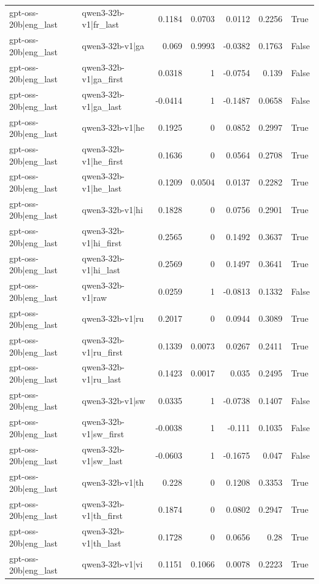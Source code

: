\begin{table}
\begin{tabular}{l l r r r r l}
gpt-oss-20b|eng_last & qwen3-32b-v1|fr_last & 0.1184 & 0.0703 & 0.0112 & 0.2256 & True \\
gpt-oss-20b|eng_last & qwen3-32b-v1|ga & 0.069 & 0.9993 & -0.0382 & 0.1763 & False \\
gpt-oss-20b|eng_last & qwen3-32b-v1|ga_first & 0.0318 & 1 & -0.0754 & 0.139 & False \\
gpt-oss-20b|eng_last & qwen3-32b-v1|ga_last & -0.0414 & 1 & -0.1487 & 0.0658 & False \\
gpt-oss-20b|eng_last & qwen3-32b-v1|he & 0.1925 & 0 & 0.0852 & 0.2997 & True \\
gpt-oss-20b|eng_last & qwen3-32b-v1|he_first & 0.1636 & 0 & 0.0564 & 0.2708 & True \\
gpt-oss-20b|eng_last & qwen3-32b-v1|he_last & 0.1209 & 0.0504 & 0.0137 & 0.2282 & True \\
gpt-oss-20b|eng_last & qwen3-32b-v1|hi & 0.1828 & 0 & 0.0756 & 0.2901 & True \\
gpt-oss-20b|eng_last & qwen3-32b-v1|hi_first & 0.2565 & 0 & 0.1492 & 0.3637 & True \\
gpt-oss-20b|eng_last & qwen3-32b-v1|hi_last & 0.2569 & 0 & 0.1497 & 0.3641 & True \\
gpt-oss-20b|eng_last & qwen3-32b-v1|raw & 0.0259 & 1 & -0.0813 & 0.1332 & False \\
gpt-oss-20b|eng_last & qwen3-32b-v1|ru & 0.2017 & 0 & 0.0944 & 0.3089 & True \\
gpt-oss-20b|eng_last & qwen3-32b-v1|ru_first & 0.1339 & 0.0073 & 0.0267 & 0.2411 & True \\
gpt-oss-20b|eng_last & qwen3-32b-v1|ru_last & 0.1423 & 0.0017 & 0.035 & 0.2495 & True \\
gpt-oss-20b|eng_last & qwen3-32b-v1|sw & 0.0335 & 1 & -0.0738 & 0.1407 & False \\
gpt-oss-20b|eng_last & qwen3-32b-v1|sw_first & -0.0038 & 1 & -0.111 & 0.1035 & False \\
gpt-oss-20b|eng_last & qwen3-32b-v1|sw_last & -0.0603 & 1 & -0.1675 & 0.047 & False \\
gpt-oss-20b|eng_last & qwen3-32b-v1|th & 0.228 & 0 & 0.1208 & 0.3353 & True \\
gpt-oss-20b|eng_last & qwen3-32b-v1|th_first & 0.1874 & 0 & 0.0802 & 0.2947 & True \\
gpt-oss-20b|eng_last & qwen3-32b-v1|th_last & 0.1728 & 0 & 0.0656 & 0.28 & True \\
gpt-oss-20b|eng_last & qwen3-32b-v1|vi & 0.1151 & 0.1066 & 0.0078 & 0.2223 & True \\

\end{tabular}
\end{table}
